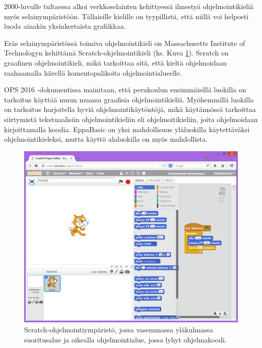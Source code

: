 2000-luvulle tultaessa alkoi
verkkoselainten kehittyessä
ilmestyä ohjelmointikieliä
myös selainympäristöön.
Tällaisille kielille on tyypillistä,
että niillä voi helposti luoda
ainakin yksinkertaista grafiikkaa.

Eräs selainympäristössä toimiva
ohjelmointikieli on Massachusetts
Institute of Technologyn kehittämä
Scratch-ohjelmointikieli
(ks. Kuva \ref{img:scratch}).
Scratch on graafinen ohjelmointikieli,
mikä tarkoittaa sitä, että
kieltä ohjelmoidaan raahaamalla
hiirellä komentopalikoita
ohjelmointialueelle.

OPS 2016 -dokumentissa mainitaan,
että perukoulun ensimmäisillä
luokilla on tarkoitus käyttää
muun muassa graafisia ohjelmointikieliä.
Myöhemmillä luokilla on tarkoitus
harjoitella hyviä ohjelmointikäytöntöjä,
mikä käytännössä tarkoittaa siirtymistä
tekstuaalisiin ohjelmointikieliin
eli ohjelmoitikieliin, joita ohjelmoidaan
kirjoittamalla koodia.
EppaBasic on yksi mahdollisuus
yläluokilla käytettäväksi ohjelmointikieleksi,
mutta käyttö alaluokilla on myös mahdollista.

\begin{figure}[h]
    \centering
    \includegraphics[width=1\textwidth]{scratch}
    \caption{Scratch-ohjelmointiympäristö, jossa vasemmassa yläkulmassa suoritusalue ja oikealla ohjelmointialue, jossa lyhyt ohjelmakoodi.}
    \label{img:scratch}
\end{figure}


